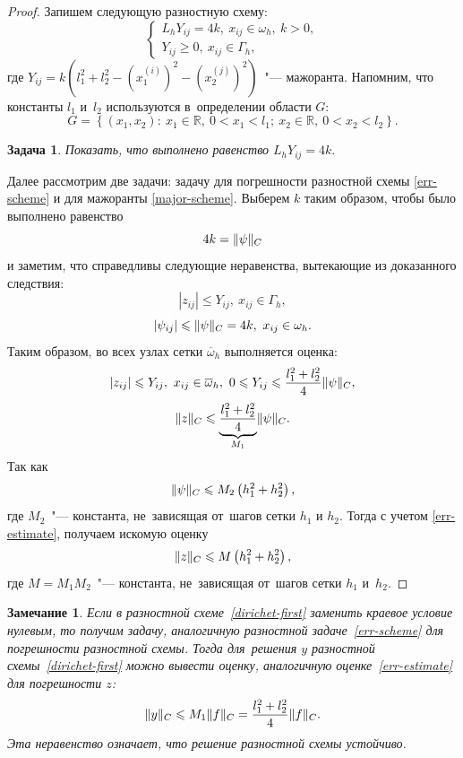 \documentclass[11pt,a4paper,twoside]{report}
\numberwithin{equation}{section}
\newtheorem*{problem}{Задача}
\theoremstyle{definition}
\theoremstyle{plain}
\newtheorem*{note*}{Замечание}
\DeclarePairedDelimiter\norm{\lVert}{\rVert}
\begin{document}
\begin{proof}
    Запишем следующую разностную схему:
    \begin{equation}
        \label{major-scheme}
        \begin{cases}
            L_hY_{ij}=4k,~x_{ij}\in\omega_h,~k>0,\\
            Y_{ij} \geqslant 0,~x_{ij}\in\Gamma_h,
        \end{cases}
    \end{equation}
    где $Y_{ij}=k\left(l_1^2+l_2^2-\left(x_1^{(i)}\right)^2-
    \left(x_2^{(j)}\right)^2\right)$~"--- мажоранта. Напомним, что константы $l_1$ и~$l_2$
    используются в~определении области $G$:
    $$
        G = \left\{(x_1, x_2)\colon~x_1 \in \mathbb{R},~0 < x_1 < l_1;
        ~x_2\in\mathbb{R},~0 < x_2 < l_2\right\}.
    $$
    \begin{problem}
        Показать, что выполнено равенство
        $
            L_hY_{ij}=4k.
        $
    \end{problem}
    \noindent
    Далее рассмотрим две задачи: задачу для погрешности разностной схемы \eqref{err-scheme} и
    для мажоранты \eqref{major-scheme}. Выберем $k$ таким образом, чтобы было выполнено равенство
    $$
        4k=\norm{\psi}_C
    $$
    и заметим, что справедливы следующие неравенства, вытекающие из доказанного
    следствия:
    $$
        |z_{ij}| \leqslant Y_{ij},~x_{ij} \in \Gamma_h,
    $$
    $$
        |\psi_{ij}| \leqslant \norm{\psi}_C=4k,~x_{ij}\in\omega_h.
    $$
    Таким образом, во всех узлах сетки $\overline{\omega}_h$ выполняется оценка:
    $$
        |z_{ij}| \leqslant Y_{ij},~x_{ij}\in\overline{\omega}_h,
        ~0 \leqslant Y_{ij} \leqslant \frac{l_1^2+l_2^2}{4}\norm{\psi}_C,
    $$
    \begin{equation}
        \label{err-estimate}
        \norm{z}_C \leqslant \underbrace{\frac{l_1^2+l_2^2}{4}}_{M_1}\norm{\psi}_C.
    \end{equation}
    Так как
    $$
        \norm{\psi}_C \leqslant M_2\left(h_1^2 + h_2^2\right),
    $$
    где $M_2$~"--- константа, не~зависящая от~шагов сетки $h_1$ и $h_2$.
    Тогда с учетом \eqref{err-estimate}, получаем искомую оценку
    $$
        \norm{z}_C \leqslant M\left(h_1^2+h_2^2\right),
    $$
    где $M=M_1M_2$~"--- константа, не~зависящая от~шагов сетки $h_1$ и~$h_2$.
\end{proof}
%
\begin{note*}
    Если в разностной схеме~\eqref{dirichet-first} заменить краевое условие
    нулевым, то получим задачу,
    аналогичную разностной задаче~\eqref{err-scheme} для погрешности разностной схемы.
    Тогда для~решения $y$ разностной схемы~\eqref{dirichet-first}
    можно вывести оценку, аналогичную оценке~\eqref{err-estimate}
    для погрешности $z$:
    $$
        \norm{y}_C \leqslant M_1\norm{f}_C =
            \dfrac{l_1^2 + l_2^2}{4}\norm{f}_C.
    $$
    Эта неравенство означает, что решение разностной схемы устойчиво.

\end{note*}
\end{document}
